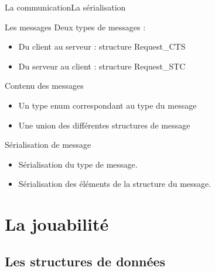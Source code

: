 \documentclass[french]{beamer}
\begin{document}
	    \begin{frame}{La communication}{La sérialisation}

	        \begin{block}{Les messages}
	            Deux types de messages :
	            \begin{itemize}
	                \item Du client au serveur : structure Request\_CTS
	                \item Du serveur au client : structure Request\_STC
	            \end{itemize}
	        \end{block}

	        \begin{block}{Contenu des messages}
	            \begin{itemize}
	                \item Un type enum correspondant au type du message
	                \item Une union des différentes structures de message
	            \end{itemize}
	        \end{block}

	        \begin{block}{Sérialisation de message}
	        	\begin{itemize}
	                \item Sérialisation du type de message.
	                \item Sérialisation des éléments de la structure du message.
	            \end{itemize}            
	        \end{block}
	    \end{frame}




















	\section{La jouabilité}
		\subsection{Les structures de données}
\end{document}

